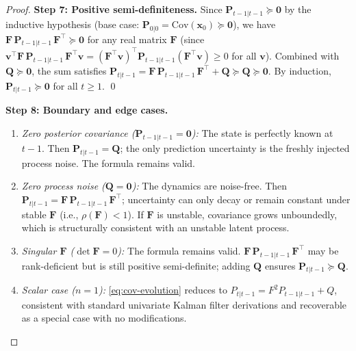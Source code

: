 \documentclass[12pt,openany]{book}
\numberwithin{equation}{chapter}
\theoremstyle{plain}
\theoremstyle{definition}
\theoremstyle{remark}
\begin{document}
\begin{proof}
\medskip
\noindent\textbf{Step 7: Positive semi-definiteness.}
Since $\mathbf{P}_{t-1|t-1} \succeq \mathbf{0}$ by the
inductive hypothesis (base case: $\mathbf{P}_{0|0}
= \mathrm{Cov}(\mathbf{x}_0) \succeq \mathbf{0}$), we have
$\mathbf{F}\,\mathbf{P}_{t-1|t-1}\,\mathbf{F}^\top \succeq \mathbf{0}$
for any real matrix $\mathbf{F}$ (since
$\mathbf{v}^\top \mathbf{F}\,\mathbf{P}_{t-1|t-1}\,\mathbf{F}^\top
\mathbf{v}
= (\mathbf{F}^\top\mathbf{v})^\top \mathbf{P}_{t-1|t-1}
  (\mathbf{F}^\top\mathbf{v}) \geq 0$
for all $\mathbf{v}$).  Combined with $\mathbf{Q} \succeq \mathbf{0}$,
the sum satisfies
$\mathbf{P}_{t|t-1}
 = \mathbf{F}\,\mathbf{P}_{t-1|t-1}\,\mathbf{F}^\top
 + \mathbf{Q}
 \succeq \mathbf{Q}
 \succeq \mathbf{0}$.
By induction, $\mathbf{P}_{t|t-1} \succeq \mathbf{0}$ for all
$t \geq 1$.  \qed

\medskip
\noindent\textbf{Step 8: Boundary and edge cases.}
\begin{enumerate}
  \item \emph{Zero posterior covariance ($\mathbf{P}_{t-1|t-1}
        = \mathbf{0}$):}  The state is perfectly known at
        $t-1$.  Then
        $\mathbf{P}_{t|t-1} = \mathbf{Q}$; the only
        prediction uncertainty is the freshly injected
        process noise.  The formula remains valid.
  \item \emph{Zero process noise ($\mathbf{Q} = \mathbf{0}$):}
        The dynamics are noise-free.  Then
        $\mathbf{P}_{t|t-1}
         = \mathbf{F}\,\mathbf{P}_{t-1|t-1}\,\mathbf{F}^\top$;
        uncertainty can only decay or remain constant under
        stable $\mathbf{F}$ (i.e., $\rho(\mathbf{F}) < 1$).
        If $\mathbf{F}$ is unstable, covariance grows
        unboundedly, which is structurally consistent with an
        unstable latent process.
  \item \emph{Singular $\mathbf{F}$ ($\det \mathbf{F} = 0$):}
        The formula remains valid.
        $\mathbf{F}\,\mathbf{P}_{t-1|t-1}\,\mathbf{F}^\top$
        may be rank-deficient but is still positive
        semi-definite; adding $\mathbf{Q}$ ensures
        $\mathbf{P}_{t|t-1} \succeq \mathbf{Q}$.
  \item \emph{Scalar case ($n = 1$):}
        \eqref{eq:cov-evolution} reduces to
        $P_{t|t-1} = F^2 P_{t-1|t-1} + Q$, consistent with
        standard univariate Kalman filter derivations and
        recoverable as a special case with no modifications.
\end{enumerate}
\end{proof}
\end{document}
